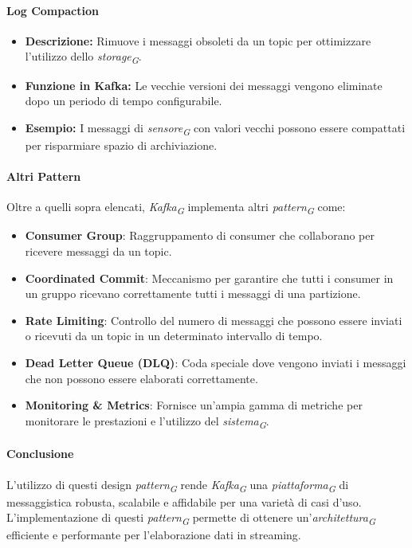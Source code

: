 \paragraph{Log Compaction}
\begin{itemize}
    \item \textbf{Descrizione:} Rimuove i messaggi obsoleti da un topic per ottimizzare l'utilizzo dello \textit{storage}\textsubscript{\textit{G}}.
    \item \textbf{Funzione in Kafka:} Le vecchie versioni dei messaggi vengono eliminate dopo un periodo di tempo configurabile.
    \item \textbf{Esempio:} I messaggi di \textit{sensore}\textsubscript{\textit{G}} con valori vecchi possono essere compattati per risparmiare spazio di archiviazione.
\end{itemize}

\paragraph{Altri Pattern}
Oltre a quelli sopra elencati, \textit{Kafka}\textsubscript{\textit{G}} implementa altri \textit{pattern}\textsubscript{\textit{G}} come:
\begin{itemize}
    \item \textbf{Consumer Group}: Raggruppamento di consumer che collaborano per ricevere messaggi da un topic.
    \item \textbf{Coordinated Commit}: Meccanismo per garantire che tutti i consumer in un gruppo ricevano correttamente tutti i messaggi di una partizione.
    \item \textbf{Rate Limiting}: Controllo del numero di messaggi che possono essere inviati o ricevuti da un topic in un determinato intervallo di tempo.
    \item \textbf{Dead Letter Queue (DLQ)}: Coda speciale dove vengono inviati i messaggi che non possono essere elaborati correttamente.
    \item \textbf{Monitoring \& Metrics}: Fornisce un'ampia gamma di metriche per monitorare le prestazioni e l'utilizzo del \textit{sistema}\textsubscript{\textit{G}}.
\end{itemize}

\paragraph{Conclusione}
L'utilizzo di questi design \textit{pattern}\textsubscript{\textit{G}} rende \textit{Kafka}\textsubscript{\textit{G}} una \textit{piattaforma}\textsubscript{\textit{G}} di messaggistica robusta, scalabile e affidabile per una varietà di casi d'uso. L'implementazione di questi \textit{pattern}\textsubscript{\textit{G}} permette di ottenere un'\textit{architettura}\textsubscript{\textit{G}} efficiente e performante per l'elaborazione dati in streaming.